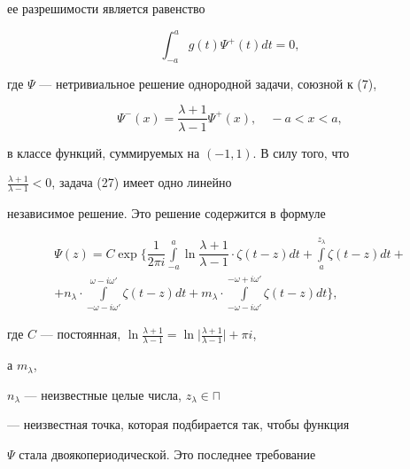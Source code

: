 ее разрешимости является равенство


\begin{equation}


\int^{a}_{-a}g(t)\Psi^{+}(t)dt=0,


\end{equation}


где $\Psi$ --- нетривиальное решение однородной задачи, союзной к (7),


\begin{equation}


\Psi^{-}(x)=\dfrac{\lambda+1}{\lambda-1}\Psi^{+}(x),


\quad -a<x<a,


\end{equation}


в классе функций, суммируемых на $(-1,1)$. В силу того, что


$\frac{\lambda+1}{\lambda-1}<0$, задача (27) имеет одно линейно


независимое решение. Это решение содержится в формуле


\begin{multline}


\Psi(z)=C\exp\bigg\{\dfrac{1}{2\pi i}


\int\limits^{a}_{-a}\ln\dfrac{\lambda+1}{\lambda-1}


\cdot\zeta(t-z)d t+\int\limits^{z_{\lambda}}_{a}


\zeta(t-z)dt+ \\


%


+n_{\lambda}\cdot\int\limits^{\omega-i\omega'}_


{-\omega-i\omega'}\zeta(t-z)dt+m_{\lambda}\cdot


\int\limits^{-\omega+i\omega'}_


{-\omega-i\omega'}\zeta(t-z)dt\bigg\},


\end{multline}


где $C$ --- постоянная, $\ln\frac{\lambda+1}{\lambda-1}=


\ln\big|\frac{\lambda+1}{\lambda-1}\big|+\pi i$,


а $m_{\lambda}$,


$n_{\lambda}$ --- неизвестные целые числа, $z_{\lambda}\in \sqcap$


--- неизвестная точка, которая подбирается так, чтобы функция


$\Psi$ стала двоякопериодической. Это последнее требование


